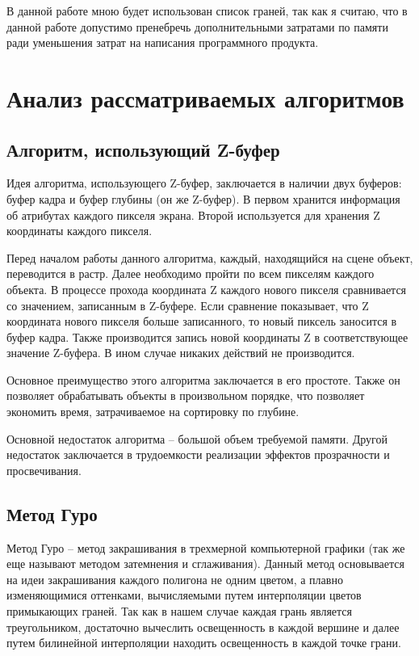 \documentclass[12pt]{report}
\begin{document}
	В данной работе мною будет использован список граней, так как я считаю, что в данной работе допустимо пренебречь дополнительными затратами по памяти ради уменьшения затрат на написания программного продукта.

	\section{Анализ рассматриваемых алгоритмов}
	
	\subsection{Алгоритм, использующий Z-буфер}
	
	Идея алгоритма, использующего Z-буфер, заключается в наличии двух буферов: буфер кадра и буфер глубины (он же Z-буфер). В первом хранится информация об атрибутах каждого пикселя экрана. Второй используется для хранения Z координаты каждого пикселя.\cite{2}
	
	Перед началом работы данного алгоритма, каждый, находящийся на сцене объект, переводится в растр. Далее необходимо пройти по всем пикселям каждого объекта. В процессе прохода координата Z каждого нового пикселя сравнивается со значением, записанным в Z-буфере. Если сравнение показывает, что Z координата нового пикселя больше записанного, то новый пиксель заносится в буфер кадра. Также производится запись новой координаты Z в соответствующее значение Z-буфера. В ином случае никаких действий не производится.
	
	Основное преимущество этого алгоритма заключается в его простоте. Также он позволяет обрабатывать объекты в произвольном порядке, что позволяет экономить время, затрачиваемое на сортировку по глубине.
	
	Основной недостаток алгоритма – большой объем требуемой памяти. Другой недостаток заключается в трудоемкости реализации эффектов прозрачности и просвечивания.

	\subsection{Метод Гуро}

	Метод Гуро – метод закрашивания в трехмерной компьютерной графики (так же еще называют методом затемнения и сглаживания). 
	Данный метод основывается на идеи закрашивания каждого полигона не одним цветом, а плавно изменяющимися оттенками, вычисляемыми путем интерполяции цветов примыкающих граней. Так как в нашем случае каждая грань является треугольником, достаточно вычеслить освещенность в каждой вершине и далее путем билинейной интерполяции находить освещенность в каждой точке грани.\cite{3}
	
\end{document}
